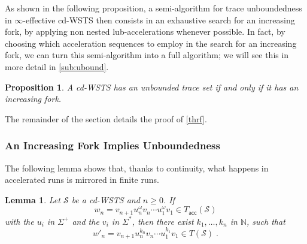 \documentclass[11pt,reqno,a4paper]{amsart}
\newcommand{\nat}{\mathbb{N}}
\theoremstyle{plain}
\newtheorem{lemma}[theorem]{Lemma}
\newtheorem{proposition}[theorem]{Proposition}
\theoremstyle{definition}
\theoremstyle{remark}
\renewcommand{\paragraph}{\subsubsection*}
\begin{document}
As shown in the following proposition, a semi-algorithm for
trace unboundedness in $\infty$-effective cd-WSTS then
consists in an exhaustive search for an increasing fork, by applying non
nested lub-accelerations whenever possible.
In fact, by choosing which acceleration sequences to employ in the search
for an increasing fork, we can turn this semi-algorithm into a full
algorithm; we will see this in more detail in \autoref{sub:ubound}.

\begin{proposition}\label{thrf}
  A cd-WSTS has an unbounded trace set if and only if it has an
  increasing fork.
\end{proposition}
The remainder of the section details the proof of
\autoref{thrf}.


\paragraph{An Increasing Fork Implies Unboundedness}
The following lemma shows that, thanks to continuity, what happens in
accelerated runs is mirrored in finite runs.  
\begin{lemma}\label{lem:finite}
  Let $\mathcal{S}$ be a cd-WSTS and $n\geq 0$.  If
  \begin{equation*}
    w_n=v_{n+1}u_n^\omega v_n\cdots u_1^\omega v_1\in T_\mathsf{acc}(\mathcal{S})
  \end{equation*}
  with the $u_i$ in $\Sigma^+$ and the $v_i$ in $\Sigma^\ast$, then there exist $k_1,\ldots,k_n$ in $\nat$, such that 
  \begin{equation*}
    w'_n=v_{n+1}u_n^{k_n}v_n\cdots u_1^{k_1}v_{1}\in T(\mathcal{S})\;.
  \end{equation*}
\end{lemma}
\end{document}
